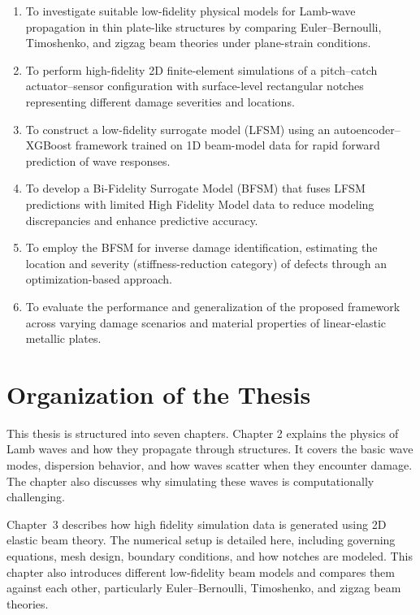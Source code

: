 \documentclass[12pt,a4paper]{report}
\begin{document}
\begin{enumerate}
    \item To investigate suitable low-fidelity physical models for Lamb-wave propagation in thin plate-like structures by comparing Euler--Bernoulli, Timoshenko, and zigzag beam theories under plane-strain conditions.
    
    \item To perform high-fidelity 2D finite-element simulations of a pitch--catch actuator--sensor configuration with surface-level rectangular notches representing different damage severities and locations.
    
    \item To construct a low-fidelity surrogate model (LFSM) using an autoencoder--XGBoost framework trained on 1D beam-model data for rapid forward prediction of wave responses.
    
    \item To develop a Bi-Fidelity Surrogate Model (BFSM) that fuses LFSM predictions with limited High Fidelity Model data to reduce modeling discrepancies and enhance predictive accuracy.
    
    \item To employ the BFSM for inverse damage identification, estimating the location and severity (stiffness-reduction category) of defects through an optimization-based approach.
    
    \item To evaluate the performance and generalization of the proposed framework across varying damage scenarios and material properties of linear-elastic metallic plates.
\end{enumerate}

\section{Organization of the Thesis}


This thesis is structured into seven chapters. Chapter 2 explains the physics of Lamb waves and how they propagate through structures. It covers the basic wave modes, dispersion behavior, and how waves scatter when they encounter damage. The chapter also discusses why simulating these waves is computationally challenging.

Chapter~3 describes how high fidelity simulation data is generated using 2D elastic beam theory. The numerical setup is detailed here, including governing equations, mesh design, boundary conditions, and how notches are modeled. This chapter also introduces different low-fidelity beam models and compares them against each other, particularly Euler--Bernoulli, Timoshenko, and zigzag beam theories.
\end{document}
